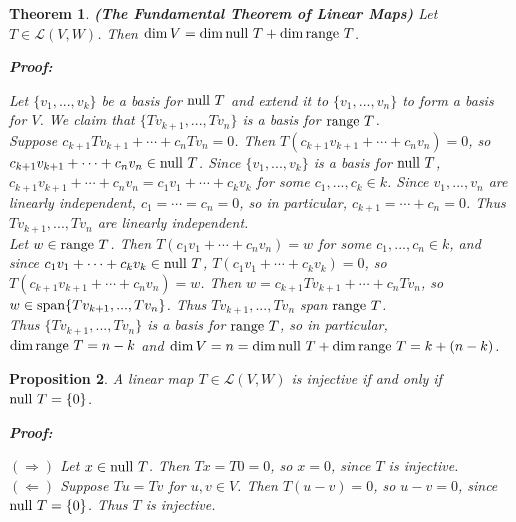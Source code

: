 \documentclass{article}
\theoremstyle{colontheorem}
\newtheorem{theorem}{Theorem}[section]
\newtheorem{proposition}[theorem]{Proposition}
\newcommand{\Span}{\textnormal{span}}
\newcommand{\Null}{\textnormal{null }}
\newcommand{\Range}{\textnormal{range }}
\newenvironment{Theorem}
{
	\begin{mdframed}[backgroundcolor=TheoremOrange!10]
	\begin{theorem}
}
{
	\end{theorem}
	\end{mdframed}
	
	\vspace{.15in}
}
\newenvironment{Proposition}
{
	\begin{mdframed}[backgroundcolor=TheoremOrange!10]
	\begin{proposition}
}
{
	\end{proposition}
	\end{mdframed}
	
	\vspace{.15in}
}
\newenvironment{Proof}
{
	\begin{mdframed}[backgroundcolor=ProofPurple!10]
	\textbf{Proof:}%
}
{
	\end{mdframed}
	
	\vspace{.085in}
}
\begin{document}
\begin{Theorem}
	
	\textbf{(The Fundamental Theorem of Linear Maps)} Let $T \in \mathcal{L}(V,W)$. Then $\dim V = \dim \Null T + \dim \Range T$.
	
	\begin{Proof}
		Let $\{v_1, ..., v_k\}$ be a basis for $\Null T$ and extend it to $\{v_1, ..., v_n\}$ to form a basis for $V$. We claim that $\{Tv_{k+1}, ..., Tv_n\}$ is a basis for $\Range T$.\\
		
		Suppose $c_{k+1} Tv_{k+1} + \cdots + c_n Tv_n = 0$. Then $T(c_{k+1} v_{k+1} + \cdots + c_n v_n) = 0$, so $c_{k+1} v_{k+1} + \cdots + c_n v_n \in \Null T$. Since $\{v_1, ..., v_k\}$ is a basis for $\Null T$, $c_{k+1} v_{k+1} + \cdots + c_n v_n = c_1 v_1 + \cdots + c_k v_k$ for some $c_1, ..., c_k \in k$. Since $v_1, ..., v_n$ are linearly independent, $c_1 = \cdots = c_n = 0$, so in particular, $c_{k+1} = \cdots + c_n = 0$. Thus $Tv_{k+1}, ..., Tv_n$ are linearly independent.\\
		
		Let $w \in \Range T$. Then $T(c_1 v_1 + \cdots + c_n v_n) = w$ for some $c_1, ..., c_n \in k$, and since $c_1 v_1 + \cdots + c_k v_k \in \Null T$, $T(c_1 v_1 + \cdots + c_k v_k) = 0$, so $T(c_{k+1} v_{k+1} + \cdots + c_n v_n) = w$. Then $w = c_{k+1} Tv_{k+1} + \cdots + c_n Tv_n$, so $w \in \Span \{Tv_{k+1}, ..., Tv_n\}$. Thus $Tv_{k+1}, ..., Tv_n$ span $\Range T$.\\
		
		Thus $\{Tv_{k+1}, ..., Tv_n\}$ is a basis for $\Range T$, so in particular, $\dim \Range T = n - k$ and $\dim V = n = \dim \Null T + \dim \Range T = k + (n-k)$.
		
	\end{Proof}
	
\end{Theorem}



\begin{Proposition}
	
	A linear map $T \in \mathcal{L}(V,W)$ is injective if and only if $\Null T = \{0\}$.
	
	\begin{Proof}
		$(\Rightarrow)$ Let $x \in \Null T$. Then $Tx = T0 = 0$, so $x = 0$, since $T$ is injective.\\
		
		$(\Leftarrow)$ Suppose $Tu = Tv$ for $u, v \in V$. Then $T(u-v) = 0$, so $u - v = 0$, since $\Null T = \{0\}$. Thus $T$ is injective.
		
	\end{Proof}
	
\end{Proposition}
\end{document}
